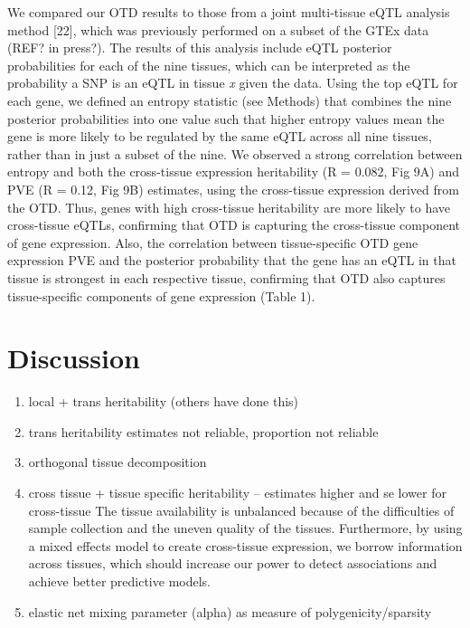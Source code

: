 \documentclass[]{article}
\begin{document}
We compared our OTD results to those from a joint multi-tissue eQTL
analysis method {[}22{]}, which was previously performed on a subset of
the GTEx data (REF? in press?). The results of this analysis include
eQTL posterior probabilities for each of the nine tissues, which can be
interpreted as the probability a SNP is an eQTL in tissue \emph{x} given
the data. Using the top eQTL for each gene, we defined an entropy
statistic (see Methods) that combines the nine posterior probabilities
into one value such that higher entropy values mean the gene is more
likely to be regulated by the same eQTL across all nine tissues, rather
than in just a subset of the nine. We observed a strong correlation
between entropy and both the cross-tissue expression heritability (R =
0.082, Fig 9A) and PVE (R = 0.12, Fig 9B) estimates, using the
cross-tissue expression derived from the OTD. Thus, genes with high
cross-tissue heritability are more likely to have cross-tissue eQTLs,
confirming that OTD is capturing the cross-tissue component of gene
expression. Also, the correlation between tissue-specific OTD gene
expression PVE and the posterior probability that the gene has an eQTL
in that tissue is strongest in each respective tissue, confirming that
OTD also captures tissue-specific components of gene expression (Table
1).

\section{Discussion}\label{discussion}

\begin{enumerate}
\def\labelenumi{\arabic{enumi}.}
\itemsep1pt\parskip0pt
\item
  local + trans heritability (others have done this)
\item
  trans heritability estimates not reliable, proportion not reliable
\item
  orthogonal tissue decomposition
\item
  cross tissue + tissue specific heritability -- estimates higher and se
  lower for cross-tissue The tissue availability is unbalanced because
  of the difficulties of sample collection and the uneven quality of the
  tissues. Furthermore, by using a mixed effects model to create
  cross-tissue expression, we borrow information across tissues, which
  should increase our power to detect associations and achieve better
  predictive models.
\item
  elastic net mixing parameter (alpha) as measure of
  polygenicity/sparsity
\end{enumerate}
\end{document}
